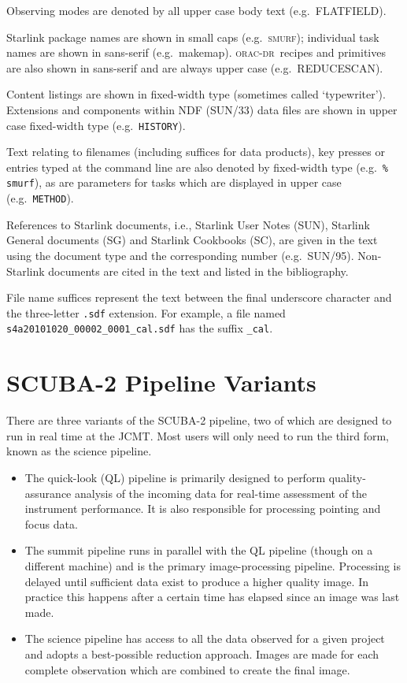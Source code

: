 \documentclass[twoside,11pt]{article}
\newcommand{\xref}[3]{#1}
\newcommand{\xlabel}[1]{}
\renewcommand{\_}{\texttt{\symbol{95}}}
\newcommand{\SMURF}{\textsc{smurf}}
\newcommand{\ndfref}{\xref{SUN/33}{sun33}{}}
\newcommand{\oracdr}{\textsc{orac-dr}}
\newcommand{\task}[1]{\textsf{#1}}
\newcommand{\makemap}{\xref{\task{makemap}}{sun258}{MAKEMAP}}
\newcommand{\aparam}[1]{\texttt{#1}}     %
\newcommand{\ndfcomp}[1]{\texttt{#1}}    %
\begin{document}
Observing modes are denoted by all upper case body text (e.g.\
FLATFIELD).

Starlink package names are shown in small caps (e.g.\ \SMURF);
individual task names are shown in sans-serif
(e.g.\ \makemap). \oracdr\ recipes and primitives are also shown in
sans-serif and are always upper case (e.g.\ \task{REDUCE\_SCAN}).

Content listings are shown in fixed-width type (sometimes called
`typewriter'). Extensions and components within NDF (\ndfref) data
files are shown in upper case fixed-width type (e.g.\
\ndfcomp{HISTORY}).

Text relating to filenames (including suffices for data products), key
presses or entries typed at the command line are also denoted by
fixed-width type (e.g.\ \texttt{\% smurf}), as are parameters for
tasks which are displayed in upper case (e.g.\ \aparam{METHOD}).

References to Starlink documents, i.e., Starlink User Notes (SUN),
Starlink General documents (SG) and Starlink Cookbooks (SC), are given
in the text using the document type and the corresponding number
(e.g.\ SUN/95). Non-Starlink documents are cited in the text and
listed in the bibliography.

File name suffices represent the text between the final underscore
character and the three-letter \verb+.sdf+ extension. For example, a
file named \verb+s4a20101020_00002_0001_cal.sdf+ has the suffix
\verb+_cal+.

\section{\xlabel{pipelines}SCUBA-2 Pipeline Variants\label{se:pipelines}}

There are three variants of the SCUBA-2 pipeline, two of which are
designed to run in real time at the JCMT. Most users will only need to
run the third form, known as the science pipeline.

\begin{itemize}
\item The quick-look (QL) pipeline is primarily designed to perform
  quality-assurance analysis of the incoming data for real-time
  assessment of the instrument performance. It is also responsible for
  processing pointing and focus data.

\item The summit pipeline runs in parallel with the QL pipeline
  (though on a different machine) and is the primary image-processing
  pipeline. Processing is delayed until sufficient data exist to
  produce a higher quality image. In practice this happens after a
  certain time has elapsed since an image was last made.

\item The science pipeline has access to all the data observed for a
  given project and adopts a best-possible reduction approach. Images
  are made for each complete observation which are combined to create
  the final image.
\end{itemize}
\end{document}

